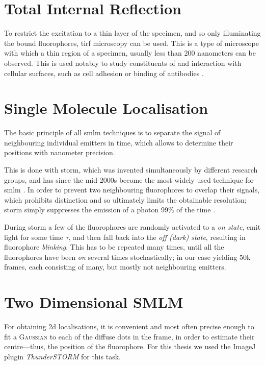 \documentclass[11pt, a4paper, oneside, twocolumn]{report}
\renewcommand{\t}{\todo}
\newcommand{\e}{\emph}
\newcommand{\x}[1]{#1\index{#1}}
\begin{document}
\t{rewrite}


\section{Total Internal Reflection}

To restrict the excitation to a thin layer of the specimen, and so
only illuminating the bound fluorophores, \gls{tirf} microscopy can be
used. This is a type of microscope with which a thin region of a
specimen, usually less than 200 nanometers can be observed. This is
used notably to study constituents of and interaction with cellular
surfaces, such as cell adhesion or binding of antibodies \t{ref}.


\section{Single Molecule Localisation}

The basic principle of all \gls{smlm} techniques is to separate the
signal of neighbouring individual emitters in time, which allows to
determine their positions with nanometer precision.

This is done with \gls{storm}, which was invented simultaneously by
different research groups, and has since the mid 2000s become the most
widely used technique for \gls{smlm} \t{ref}. In order to prevent two
neighbouring fluorophores to overlap their signals, which prohibits
distinction and so ultimately limits the obtainable resolution;
\gls{storm} simply suppresses the emission of a photon 99\% of the
time \t{explain}.

During \gls{storm} a few of the fluorophores are randomly activated to
a \e{on state}, emit light for some time $\tau$, and then fall back
into the \e{off (dark) state}, resulting in fluorophore
\e{blinking}. This has to be repeated many times, until all the
fluorophores have been \e{on} several times stochastically; in our
case yielding 50k frames, each consisting of many, but mostly not
neighbouring emitters.


\section{Two Dimensional SMLM}

For obtaining 2d localisations, it is convenient and most often
precise enough to fit a \textsc{\x{Gaussian}} to each of the diffuse dots
in the frame, in order to estimate their centre---thus, the position
of the fluorophore. For this thesis we used the ImageJ plugin
\e{ThunderSTORM} \cite{omk14} for this task.
\end{document}
